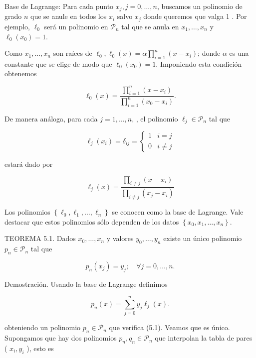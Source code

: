 \documentclass[10pt]{article}
\begin{document}
Base de Lagrange: Para cada punto $x_{j}, j=0, \ldots, n$, buscamos un polinomio de grado $n$ que se anule en todos los $x_{i}$ salvo $x_{j}$ donde queremos que valga 1 . Por ejemplo, $\ell_{0}$ será un polinomio en $\mathcal{P}_{n}$ tal que se anula en $x_{1}, \ldots, x_{n}$ y $\ell_{0}\left(x_{0}\right)=1$.

Como $x_{1}, \ldots, x_{n}$ son raíces de $\ell_{0}, \ell_{0}(x)=\alpha \prod_{i=1}^{n}\left(x-x_{i}\right)$; donde $\alpha$ es una constante que se elige de modo que $\ell_{0}\left(x_{0}\right)=1$. Imponiendo esta condición obtenemos

$$
\ell_{0}(x)=\frac{\prod_{i=1}^{n}\left(x-x_{i}\right)}{\prod_{i=1}^{n}\left(x_{0}-x_{i}\right)} .
$$

De manera análoga, para cada $j=1, \ldots, n$, , el polinomio $\ell_{j} \in \mathcal{P}_{n}$ tal que

$$
\ell_{j}\left(x_{i}\right)=\delta_{i j}= \begin{cases}1 & i=j \\ 0 & i \neq j\end{cases}
$$

estará dado por


\begin{equation*}
\ell_{j}(x)=\frac{\prod_{i \neq j}\left(x-x_{i}\right)}{\prod_{i \neq j}\left(x_{j}-x_{i}\right)} \tag{5.2}
\end{equation*}


Los polinomios $\left\{\ell_{0}, \ell_{1}, \ldots, \ell_{n}\right\}$ se conocen como la base de Lagrange. Vale destacar que estos polinomios sólo dependen de los datos $\left\{x_{0}, x_{1}, \ldots, x_{n}\right\}$.

TEOREMA 5.1. Dados $x_{0}, \ldots, x_{n}$ y valores $y_{0}, \ldots, y_{n}$ existe un único polinomio $p_{n} \in \mathcal{P}_{n}$ tal que

$$
p_{n}\left(x_{j}\right)=y_{j} ; \quad \forall j=0, \ldots, n .
$$

Demostración. Usando la base de Lagrange definimos


\begin{equation*}
p_{n}(x)=\sum_{j=0}^{n} y_{j} \ell_{j}(x) . \tag{5.3}
\end{equation*}


obteniendo un polinomio $p_{n} \in \mathcal{P}_{n}$ que verifica (5.1). Veamos que es único. Supongamos que hay dos polinomios $p_{n}, q_{n} \in \mathcal{P}_{n}$ que interpolan la tabla de pares ( $x_{i}, y_{i}$ ), esto es
\end{document}

